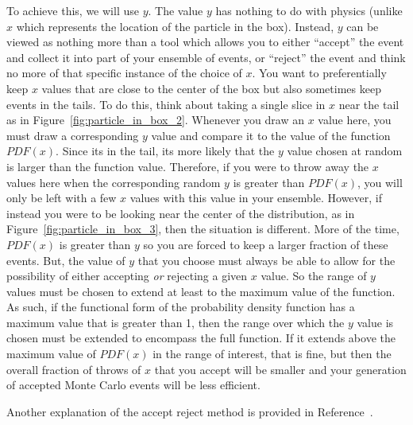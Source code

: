 \documentclass[UKenglish,texlive=2016]{\ATLASLATEXPATH atlasdoc}
\begin{document}
To achieve this, we will use $y$.  The value $y$ has nothing to do with physics (unlike $x$ which represents the location of the particle in the box).  Instead, $y$ can be viewed as nothing more than a tool which allows you to either ``accept'' the event and collect it into part of your ensemble of events, or ``reject'' the event and think no more of that specific instance of the choice of $x$.  You want to preferentially keep $x$ values that are close to the center of the box but also sometimes keep events in the tails.  To do this, think about taking a single slice in $x$ near the tail as in Figure~\ref{fig:particle_in_box_2}.  Whenever you draw an $x$ value here, you must draw a corresponding $y$ value and compare it to the value of the function $PDF(x)$.  Since its in the tail, its more likely that the $y$ value chosen at random is larger than the function value.  Therefore, if you were to throw away the $x$ values here when the corresponding random $y$ is greater than $PDF(x)$, you will only be left with a few $x$ values with this value in your ensemble.  However, if instead you were to be looking near the center of the distribution, as in Figure~\ref{fig:particle_in_box_3}, then the situation is different.  More of the time, $PDF(x)$ is greater than $y$ so you are forced to keep a larger fraction of these events.  But, the value of $y$ that you choose must always be able to allow for the possibility of either accepting \textit{or} rejecting a given $x$ value.  So the range of $y$ values must be chosen to extend at least to the maximum value of the function.  As such, if the functional form of the probability density function has a maximum value that is greater than 1, then the range over which the $y$ value is chosen must be extended to encompass the full function.  If it extends above the maximum value of $PDF(x)$ in the range of interest, that is fine, but then the overall fraction of throws of $x$ that you accept will be smaller and your generation of accepted Monte Carlo events will be less efficient.

\begin{center}
\end{center}

Another explanation of the accept reject method is provided in Reference~\cite{acceptreject_video}.
\end{document}
